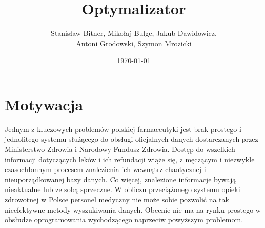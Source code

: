 \documentclass[12pt, a4paper]{article}
\title{Optymalizator}
\author{Stanisław Bitner, Mikołaj Bulge, Jakub Dawidowicz,\\Antoni Grodowski, Szymon Mrozicki}
\date{\today}
\begin{document}
\maketitle

\section{Motywacja}
Jednym z kluczowych problemów polskiej farmaceutyki jest brak
prostego i jednolitego systemu służącego do obsługi oficjalnych
danych dostarczanych przez Ministerstwo Zdrowia i Narodowy Fundusz
Zdrowia. Dostęp do wszelkich informacji dotyczących leków i ich
refundacji wiąże się, z męczącym i niezwykle czasochłonnym procesem
znalezienia ich wewnątrz chaotycznej i nieuporządkowanej bazy danych.
Co więcej, znalezione informacje bywają nieaktualne lub ze sobą
sprzeczne. W obliczu przeciążonego systemu opieki zdrowotnej w Polsce
personel medyczny nie może sobie pozwolić na tak nieefektywne metody
wyszukiwania danych. Obecnie nie ma na rynku prostego w obsłudze
oprogramowania wychodzącego naprzeciw powyższym problemom.
\end{document}
